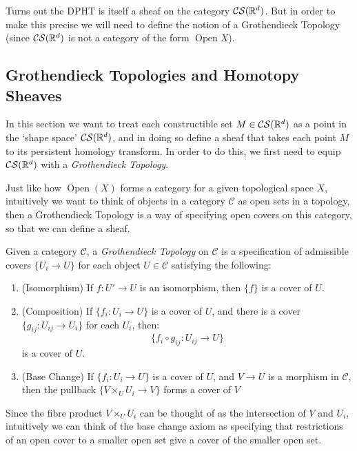 Turns out the DPHT is itself a sheaf on the category \(\mathcal{CS}(\mathbb{R}^d)\). But in order to make this precise we will need to define the notion of a Grothendieck Topology (since \(\mathcal{CS}(\mathbb{R}^d)\) is not a category of the form \(\operatorname{Open}X\)). 

\subsection{Grothendieck Topologies and Homotopy Sheaves}

In this section we want to treat each constructible set \(M\in \mathcal{CS}(\mathbb{R}^d)\) as a point in the `shape space' \(\mathcal{CS}(\mathbb{R}^d)\), and in doing so define a sheaf that takes each point \(M\) to its persistent homology transform. In order to do this, we first need to equip \(\mathcal{CS}(\mathbb{R}^d)\) with a \textit{Grothendieck Topology}. 

Just like how \(\operatorname{Open}(X)\) forms a category for a given topological space \(X\), intuitively we want to think of objects in a category \(\mathcal{C}\) as open sets in a topology, then a Grothendieck Topology is a way of specifying open covers on this category, so that we can define a sheaf. 

\begin{definition}
Given a category \(\mathcal{C}\), a \textit{Grothendieck Topology} on \(\mathcal C\) is a specification of admissible covers \(\{U_i\rightarrow U\}\) for each object \(U\in\mathcal C\) satisfying the following:

\begin{enumerate}
        \item (Isomorphism) If \(f:U'\rightarrow U\) is an isomorphism, then \(\{f\}\) is a cover of \(U\).
        \item (Composition) If \(\{f_i: U_i\rightarrow U\}\) is a cover of \(U\), and there is a cover \(\{g_{ij}:U_{ij}\rightarrow U_i\}\) for each \(U_i\), then:
        \[\{f_i\circ g_{ij}:U_{ij}\rightarrow U\}\]
        is a cover of \(U\).
        \item (Base Change) If \(\{f_i: U_i\rightarrow U\}\) is a cover of \(U\), and \(V\rightarrow U\) is a morphism in \(\mathcal C\), then the pullback \(\{V\times_U U_i\rightarrow V\}\) forms a cover of \(V\)
    \end{enumerate}
\end{definition}

Since the fibre product \(V\times_U U_i\) can be thought of as the intersection of \(V\) and \(U_i\), intuitively we can think of the base change axiom as specifying that restrictions of an open cover to a smaller open set give a cover of the smaller open set.

